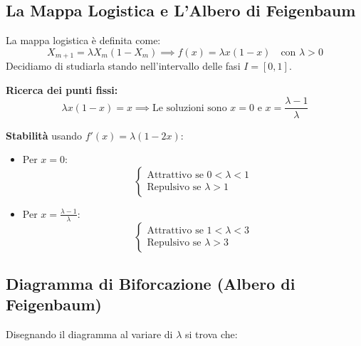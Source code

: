 \documentclass[openany]{book}
\theoremstyle{definition}
\theoremstyle{remark}
\begin{document}
\subsection{La Mappa Logistica e L'Albero di Feigenbaum}

La mappa logistica è definita come:
$$ X_{m+1} = \lambda X_m (1 - X_m) \implies f(x) = \lambda x (1 - x) \quad \text{con } \lambda > 0 $$
Decidiamo di studiarla stando nell'intervallo delle fasi $I = [0, 1]$.

\textbf{Ricerca dei punti fissi:}
$$ \lambda x (1 - x) = x \implies \text{Le soluzioni sono } x = 0 \text{ e } x = \frac{\lambda - 1}{\lambda} $$

\textbf{Stabilità} usando $f'(x) = \lambda (1 - 2x)$:
\begin{itemize}
    \item Per $x = 0$: 
    $$ \begin{cases} \text{Attrattivo se } 0 < \lambda < 1 \\ \text{Repulsivo se } \lambda > 1 \end{cases} $$
    
    \item Per $x = \frac{\lambda - 1}{\lambda}$: 
    $$ \begin{cases} \text{Attrattivo se } 1 < \lambda < 3 \\ \text{Repulsivo se } \lambda > 3 \end{cases} $$
\end{itemize}

\subsection*{Diagramma di Biforcazione (Albero di Feigenbaum)}

Disegnando il diagramma al variare di $\lambda$ si trova che:
\end{document}

